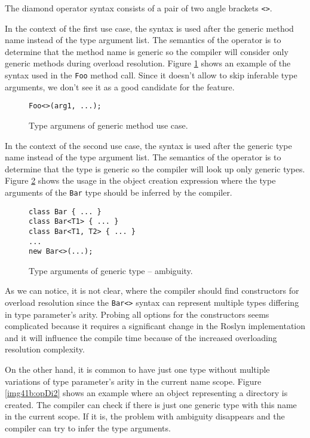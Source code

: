 The diamond operator syntax consists of a pair of two angle brackets \texttt{<>}.
\par
In the context of the first use case, the syntax is used after the generic method name instead of the type argument list.
The semantics of the operator is to determine that the method name is generic so the compiler will consider only generic methods during overload resolution.
Figure \ref{img40:opDi1} shows an example of the syntax used in the \texttt{Foo} method call.
Since it doesn't allow to skip inferable type arguments, we don't see it as a good candidate for the feature.
\begin{figure}[h]
\begin{lstlisting}[style=csharp]
Foo<>(arg1, ...);
\end{lstlisting}
\caption{Type argumens of generic method use case.}
\label{img40:opDi1}
\end{figure}
\par
In the context of the second use case, the syntax is used after the generic type name instead of the type argument list.
The semantics of the operator is to determine that the type is generic so the compiler will look up only generic types.
Figure \ref{img41a:opDi2} shows the usage in the object creation expression where the type arguments of the \texttt{Bar} type should be inferred by the compiler.
\begin{figure}[h!]
\begin{lstlisting}[style=csharp]
class Bar { ... }
class Bar<T1> { ... }
class Bar<T1, T2> { ... }
...
new Bar<>(...);
\end{lstlisting}
\caption{Type arguments of generic type -- ambiguity.}
\label{img41a:opDi2}
\end{figure}
As we can notice, it is not clear, where the compiler should find constructors for overload resolution since the \texttt{Bar<>} syntax can represent multiple types differing in type parameter's arity.
Probing all options for the constructors seems complicated because it requires a significant change in the Roslyn implementation and it will influence the compile time because of the increased overloading resolution complexity. 
\par
On the other hand, it is common to have just one type without multiple variations of type parameter's arity in the current name scope.
Figure \ref{img41b:opDi2} shows an example where an object representing a directory is created.
The compiler can check if there is just one generic type with this name in the current scope.
If it is, the problem with ambiguity disappears and the compiler can try to infer the type arguments.
